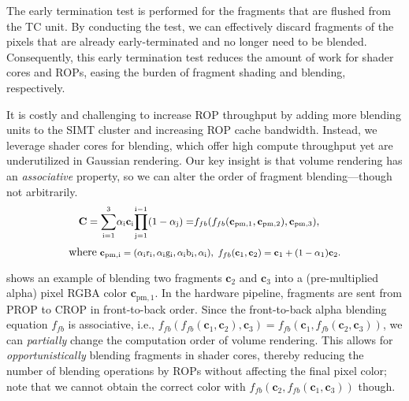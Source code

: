 The early termination test is performed for the fragments that are flushed from
the TC unit. By conducting the test, we can effectively discard fragments of
the pixels that are already early-terminated and no longer need to be blended.
Consequently, this early termination test reduces the amount of work for shader
cores and ROPs, easing the burden of fragment shading and blending,
respectively.


It is costly and challenging to increase ROP throughput by adding more blending
units to the SIMT cluster and increasing ROP cache bandwidth.
%
Instead, we leverage shader cores for blending, which offer high compute
throughput yet are underutilized in Gaussian rendering.
%
Our key insight is that volume rendering has an \emph{associative} property, so
we can alter the order of fragment blending---though not arbitrarily.
%
\begin{equation}
\small
\begin{aligned}
  \mathbf{{C}} = \mathrm{\sum\limits_{i=1}^{3}} \mathrm{\alpha_i\mathbf{c}_i} \mathrm{\prod_{j=1}^{i-1}} \mathrm{(1-\alpha_j)} 
  =& f_{fb} (f_{fb}(\mathbf{c}_{\mathrm{pm},1}, \mathbf{c}_{\mathrm{pm},2}), \mathbf{c}_{\mathrm{pm},3}),
  \label{eqn:a-blending-order}
\end{aligned}
\end{equation}
\begin{equation*}
\text{ where}
\footnotesize
  \text{$
  ~\mathbf{c}_{\mathrm{pm,i}}=\mathrm{(\alpha_i r_i,\alpha_i g_i}\mathrm{, \alpha_i b_i, \alpha_i)},
  ~f_{fb}(\mathbf{c}_{1}, \mathbf{c}_{2}) = \mathbf{c}_{1} + (1 - \alpha_1) \mathbf{c}_{2}.
  $
  }
\end{equation*}

 shows an example of blending two fragments
$\mathbf{c}_2$ and $\mathbf{c}_3$ into a (pre-multiplied alpha) pixel RGBA
color $\mathbf{c}_{\mathrm{pm},1}$. 
%
In the hardware pipeline, fragments are sent from PROP to CROP in front-to-back
order.
%
Since the front-to-back alpha blending equation $f_{fb}$ is associative, i.e.,
$f_{fb}(f_{fb}(\mathbf{c}_{1}, \mathbf{c}_{2}), \mathbf{c}_{3}) =
f_{fb}(\mathbf{c}_{1}, f_{fb}(\mathbf{c}_{2}, \mathbf{c}_{3}))$, we can
\emph{partially} change the computation order of volume rendering.
%
This allows for \emph{opportunistically} blending fragments in shader cores,
thereby reducing the number of blending operations by ROPs without
affecting the final pixel color; note that we cannot obtain the correct color
with $f_{fb}(\mathbf{c}_2, f_{fb}(\mathbf{c}_1, \mathbf{c}_3))$ though.


